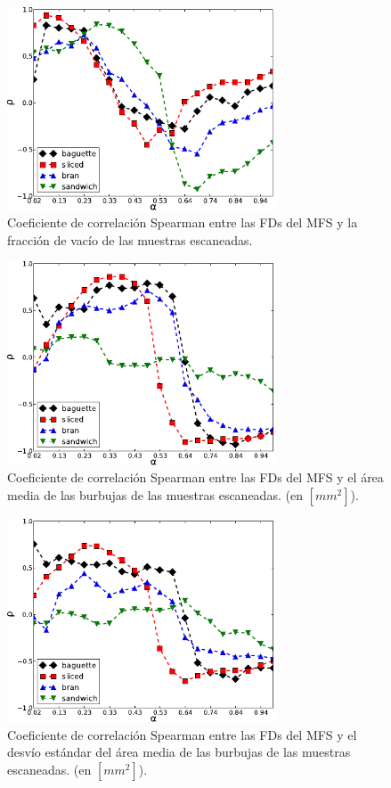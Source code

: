 \begin{figure}[h!]
\centering
\includegraphics[width=8cm]{VF}
\caption{Coeficiente de correlación Spearman entre las FDs del MFS y la fracción de vacío de las muestras escaneadas.}
\label{fig:corrVF}
\end{figure}

\begin{figure}[h!]
\centering
\includegraphics[width=8cm]{MCA}
\caption{Coeficiente de correlación Spearman entre las FDs del MFS y el área media de las burbujas de las muestras escaneadas. (en $[mm^{2}]$).}
\label{fig:corrMCA}
\end{figure}

\begin{figure}[h!]
\centering
\includegraphics[width=8cm]{stMCA}
\caption{Coeficiente de correlación Spearman entre las FDs del MFS y el desvío estándar del área media de las burbujas de las muestras escaneadas. (en $[mm^{2}]$).}
\label{fig:corrMCAstdev}
\end{figure}




